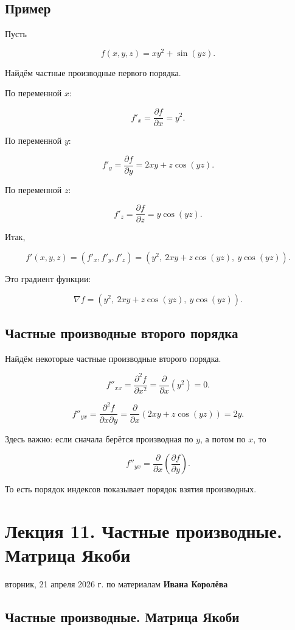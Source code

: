 \documentclass[a4paper,12pt]{article}
\begin{document}
\subsection*{Пример}

Пусть

\[
f(x,y,z)=xy^2+\sin(yz).
\]

Найдём частные производные первого порядка.

По переменной $x$:

\[
f'_x
=
\frac{\partial f}{\partial x}
=
y^2.
\]

По переменной $y$:

\[
f'_y
=
\frac{\partial f}{\partial y}
=
2xy+z\cos(yz).
\]

По переменной $z$:

\[
f'_z
=
\frac{\partial f}{\partial z}
=
y\cos(yz).
\]

Итак,

\[
f'(x,y,z)
=
(f'_x,f'_y,f'_z)
=
(y^2,\ 2xy+z\cos(yz),\ y\cos(yz)).
\]

Это градиент функции:

\[
\nabla f
=
(y^2,\ 2xy+z\cos(yz),\ y\cos(yz)).
\]

\subsection*{Частные производные второго порядка}

Найдём некоторые частные производные второго порядка.

\[
f''_{xx}
=
\frac{\partial^2 f}{\partial x^2}
=
\frac{\partial}{\partial x}(y^2)
=
0.
\]

\[
f''_{yx}
=
\frac{\partial^2 f}{\partial x\partial y}
=
\frac{\partial}{\partial x}(2xy+z\cos(yz))
=
2y.
\]

Здесь важно: если сначала берётся производная по $y$, а потом по $x$, то

\[
f''_{yx}
=
\frac{\partial}{\partial x}
\left(
\frac{\partial f}{\partial y}
\right).
\]

То есть порядок индексов показывает порядок взятия производных.

\section{Лекция 11. Частные производные. Матрица Якоби}

вторник, 21 апреля 2026 г. по материалам \textbf{Ивана Королёва}

\subsection*{Частные производные. Матрица Якоби}
\end{document}
